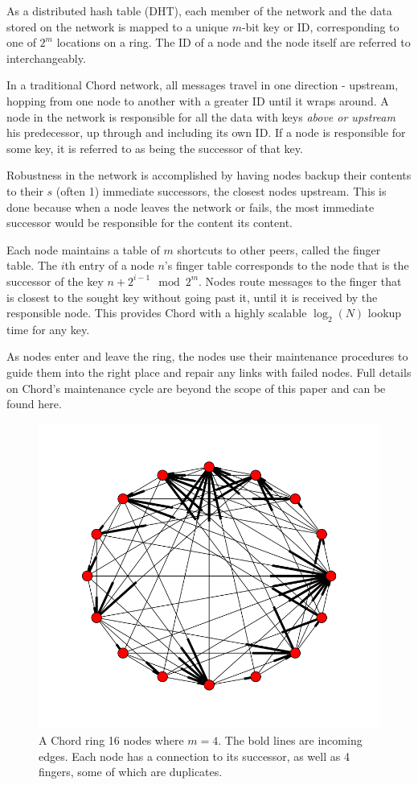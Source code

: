 As a distributed hash table (DHT), each member of the network and the data stored on the network is mapped to a unique $m$-bit key or ID, corresponding to one of  $2^m$ locations on a ring. 
The ID of a node and the node itself are referred to interchangeably.

In a traditional Chord network, all messages travel in one direction - upstream, hopping from one node to another with a greater ID until it wraps around.
A node in the network is responsible for all the data with keys \textit{above or upstream} his predecessor, up through and including its own ID.  If a node is responsible for some key, it is referred to as being the successor of that key.

Robustness in the network is accomplished by having nodes backup their contents to their $s$ (often 1) immediate successors, the closest nodes upstream.  
This is done because when a node leaves the network or fails, the most immediate successor would be responsible for the content its content.

Each node maintains a table of $m$ shortcuts to other peers, called the finger table.   The $i$th entry of a node $n$'s finger table corresponds to the node that is the successor of the key $n+2^{i-1} \mod 2^m $.  
Nodes route messages to the finger that is closest to the sought key without going past it, until it is received by the responsible node.  This provides Chord with a highly scalable $\log_2(N)$ lookup time for any key\cite{chord}.

As nodes enter and leave the ring, the nodes use their maintenance procedures to guide them into the right place and repair any links with failed nodes.  Full details on Chord's maintenance cycle are beyond the scope of this paper and can be found here\cite{chord}.

\begin{figure}
	\includegraphics[width=0.5\linewidth]{chordreal}
	\caption{A Chord ring 16 nodes where $m=4$.  The bold lines are incoming edges.  Each node has a connection to its successor, as well as 4 fingers, some of which are duplicates.}
	\label{chordreal}
\end{figure}


